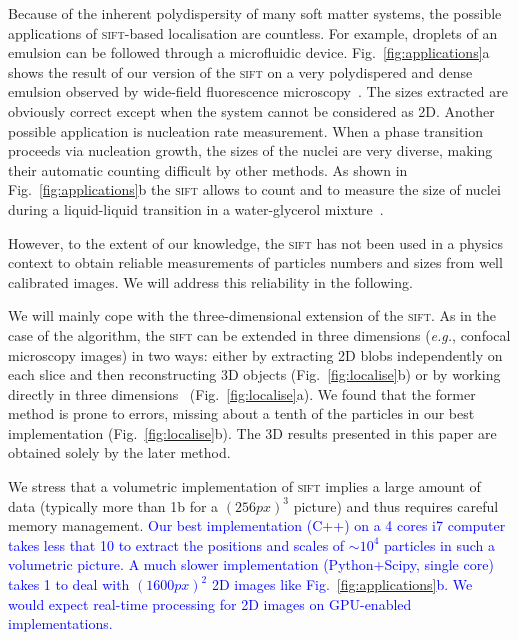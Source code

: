 \documentclass[8.5pt,twoside,twocolumn]{article}
\begin{document}
Because of the inherent polydispersity of many soft matter systems, the possible applications of \textsc{sift}-based localisation are countless. For example, droplets of an emulsion can be followed through a microfluidic device. Fig.~\ref{fig:applications}a shows the result of our version of the \textsc{sift} on a very polydispered and dense emulsion observed by wide-field fluorescence microscopy~\cite{Montagne2011}. The sizes extracted are obviously correct except when the system cannot be considered as 2D. Another possible application is nucleation rate measurement. When a phase transition proceeds via nucleation growth, the sizes of the nuclei are very diverse, making their automatic counting difficult by other methods. As shown in Fig.~\ref{fig:applications}b the \textsc{sift} allows to count and to measure the size of nuclei during a liquid-liquid transition in a water-glycerol mixture~\cite{Murata2012}.

However, to the extent of our knowledge, the \textsc{sift} has not been used in a physics context to obtain reliable measurements of particles numbers and sizes from well calibrated images. We will address this reliability in the following.

We will mainly cope with the three-dimensional extension of the \textsc{sift}. As in the case of the \citet{Crocker1996} algorithm, the \textsc{sift} can be extended in three dimensions (\emph{e.g.}, confocal microscopy images) in two ways: either by extracting 2D blobs independently on each slice and then reconstructing 3D objects (Fig.~\ref{fig:localise}b) or by working directly in three dimensions~\cite{Urschler2006, Cheung2009} (Fig.~\ref{fig:localise}a). We found that the former method is prone to errors, missing about a tenth of the particles in our best implementation (Fig.~\ref{fig:localise}b). The 3D results presented in this paper are obtained solely by the later method.

We stress that a volumetric implementation of \textsc{sift} implies a large amount of data (typically more than \unit{1}{\giga b} for a $(\unit{256}{px})^3$ picture) and thus requires careful memory management. \textcolor{blue}{Our best implementation (C++) on a 4 cores i7 computer takes less that \unit{10}{\second} to extract the positions and scales of $\sim 10^4$ particles in such a volumetric picture. A much slower implementation (Python+Scipy, single core) takes \unit{1}{\second} to deal with $(\unit{1600}{px})^2$ 2D images like Fig.~\ref{fig:applications}b. We would expect real-time processing for 2D images on GPU-enabled implementations.}
\end{document}
